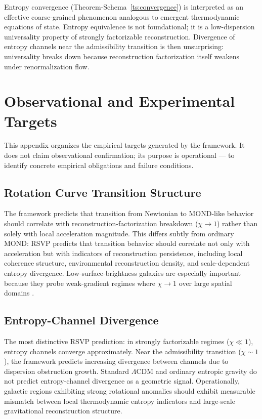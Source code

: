 \documentclass[11pt, a4paper]{article}
\theoremstyle{plain}
\theoremstyle{definition}
\theoremstyle{remark}
\begin{document}
Entropy convergence (Theorem-Schema~\ref{ts:convergence}) is interpreted as an
effective coarse-grained phenomenon analogous to emergent thermodynamic equations of
state. Entropy equivalence is not foundational; it is a low-dispersion universality
property of strongly factorizable reconstruction. Divergence of entropy channels near
the admissibility transition is then unsurprising: universality breaks down because
reconstruction factorization itself weakens under renormalization flow.

\section{Observational and Experimental Targets}
\label{app:obs}

This appendix organizes the empirical targets generated by the framework. It does not
claim observational confirmation; its purpose is operational --- to identify concrete
empirical obligations and failure conditions.

\subsection{Rotation Curve Transition Structure}

The framework predicts that transition from Newtonian to MOND-like behavior should
correlate with reconstruction-factorization breakdown ($\chi \to 1$) rather than
solely with local acceleration magnitude. This differs subtly from ordinary MOND:
RSVP predicts that transition behavior should correlate not only with acceleration
but with indicators of reconstruction persistence, including local coherence
structure, environmental reconstruction density, and scale-dependent entropy
divergence. Low-surface-brightness galaxies are especially important because they
probe weak-gradient regimes where $\chi \to 1$ over large spatial domains
\cite{famaey2012}.

\subsection{Entropy-Channel Divergence}

The most distinctive RSVP prediction: in strongly factorizable regimes ($\chi \ll
1$), entropy channels converge approximately. Near the admissibility transition
($\chi \sim 1$), the framework predicts increasing divergence between channels due to
dispersion obstruction growth. Standard $\Lambda$CDM and ordinary entropic gravity do
not predict entropy-channel divergence as a geometric signal. Operationally, galactic
regions exhibiting strong rotational anomalies should exhibit measurable mismatch
between local thermodynamic entropy indicators and large-scale gravitational
reconstruction structure.
\end{document}
